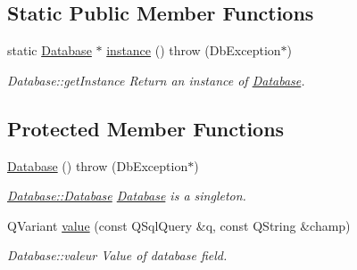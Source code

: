 \subsection*{Static Public Member Functions}
\begin{DoxyCompactItemize}
\item 
static \hyperlink{classDatabase}{Database} $\ast$ \hyperlink{classDatabase_aa334760d1e18f82a344fb696547bfa5c}{instance} ()  throw (\+Db\+Exception$\ast$)
\begin{DoxyCompactList}\small\item\em Database\+::get\+Instance Return an instance of \hyperlink{classDatabase}{Database}. \end{DoxyCompactList}\end{DoxyCompactItemize}
\subsection*{Protected Member Functions}
\begin{DoxyCompactItemize}
\item 
\hypertarget{classDatabase_a4703c80e6969d33565ea340f768fdadf}{\hyperlink{classDatabase_a4703c80e6969d33565ea340f768fdadf}{Database} ()  throw (\+Db\+Exception$\ast$)}\label{classDatabase_a4703c80e6969d33565ea340f768fdadf}

\begin{DoxyCompactList}\small\item\em \hyperlink{classDatabase_a4703c80e6969d33565ea340f768fdadf}{Database\+::\+Database} \hyperlink{classDatabase}{Database} is a singleton. \end{DoxyCompactList}\item 
Q\+Variant \hyperlink{classDatabase_a88f0ccd102fc421fb10ddad0fd94e8c1}{value} (const Q\+Sql\+Query \&q, const Q\+String \&champ)
\begin{DoxyCompactList}\small\item\em Database\+::valeur Value of database field. \end{DoxyCompactList}\end{DoxyCompactItemize}
